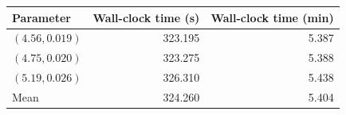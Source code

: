 \begin{tabular}{@{}lrr@{}}
\toprule
Parameter & Wall-clock time (s) & Wall-clock time (min)\\
\midrule
$(4.56,0.019)$ & 323.195 & 5.387\\
$(4.75,0.020)$ & 323.275 & 5.388\\
$(5.19,0.026)$ & 326.310 & 5.438\\
Mean & 324.260 & 5.404\\
\bottomrule
\end{tabular}
